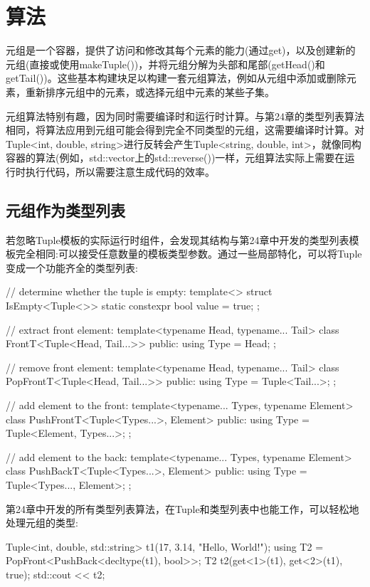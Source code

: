 \section{算法}

元组是一个容器，提供了访问和修改其每个元素的能力(通过get)，以及创建新的元组(直接或使用makeTuple())，并将元组分解为头部和尾部(getHead()和getTail())。这些基本构建块足以构建一套元组算法，例如从元组中添加或删除元素，重新排序元组中的元素，或选择元组中元素的某些子集。

元组算法特别有趣，因为同时需要编译时和运行时计算。与第24章的类型列表算法相同，将算法应用到元组可能会得到完全不同类型的元组，这需要编译时计算。对Tuple<int, double, string>进行反转会产生Tuple<string, double, int>，就像同构容器的算法(例如，std::vector上的std::reverse())一样，元组算法实际上需要在运行时执行代码，所以需要注意生成代码的效率。

\subsection{元组作为类型列表}

若忽略Tuple模板的实际运行时组件，会发现其结构与第24章中开发的类型列表模板完全相同:可以接受任意数量的模板类型参数。通过一些局部特化，可以将Tuple变成一个功能齐全的类型列表:

\begin{cpp}
// determine whether the tuple is empty:
template<>
struct IsEmpty<Tuple<>> {
	static constexpr bool value = true;
};

// extract front element:
template<typename Head, typename... Tail>
class FrontT<Tuple<Head, Tail...>> {
	public:
	using Type = Head;
};

// remove front element:
template<typename Head, typename... Tail>
class PopFrontT<Tuple<Head, Tail...>> {
	public:
	using Type = Tuple<Tail...>;
};

// add element to the front:
template<typename... Types, typename Element>
class PushFrontT<Tuple<Types...>, Element> {
	public:
	using Type = Tuple<Element, Types...>;
};

// add element to the back:
template<typename... Types, typename Element>
class PushBackT<Tuple<Types...>, Element> {
	public:
	using Type = Tuple<Types..., Element>;
};
\end{cpp}

第24章中开发的所有类型列表算法，在Tuple和类型列表中也能工作，可以轻松地处理元组的类型:

\begin{cpp}
Tuple<int, double, std::string> t1(17, 3.14, "Hello, World!");
using T2 = PopFront<PushBack<decltype(t1), bool>>;
T2 t2(get<1>(t1), get<2>(t1), true);
std::cout << t2;
\end{cpp}

